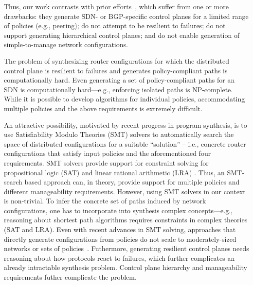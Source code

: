 Thus, our work contrasts with prior efforts~\cite{netegg, propane,
  merlin, simple, fattire, netkat, netkatcompiler, sol}, which suffer
from one or more drawbacks: they generate SDN- or BGP-specific
control planes for a limited range of policies (e.g., peering); do not
attempt to be resilient to failures; do not support generating
hierarchical control planes; and do not enable generation of
simple-to-manage network configurations. 

The problem of synthesizing router configurations for which the
distributed control plane is resilient to failures and generates
policy-compliant paths is computationally hard. Even generating a set
of policy-compliant paths for an SDN is computationally hard---e.g.,
enforcing isolated paths is NP-complete. While it is possible to
develop algorithms for individual policies, accommodating multiple
policies and the above requirements is extremely difficult.


An attractive possibility, motivated by recent progress in program
synthesis, is to use
Satisfiability Modulo Theories (SMT) solvers to automatically search
the space of distributed configurations for a suitable ``solution'' --
i.e., concrete router configurations that satisfy input policies and
the aforementioned four requirements. SMT solvers provide support for
constraint solving for propositional logic (SAT) and linear rational
arithmetic (LRA) . Thus, an SMT-search based approach can, in theory,
provide support for multiple policies and different manageability
requirements.  However, using SMT solvers in our context is
non-trivial.  To infer the concrete set of paths induced by network
configurations, one has to incorporate into synthesis complex
concepts---e.g., reasoning about shortest path algorithms requires
constraints in complex theories (SAT and LRA).  Even with recent
advances in SMT solving, approaches that directly generate
configurations from policies do not scale to moderately-sized networks
or sets of policies~\cite{synet}. Futhermore, generating resilient
control planes needs reasoning about how protocols react to failures,
which further complicates an already intractable synthesis
problem. Control plane hierarchy and manageability requirements futher
complicate the problem.

